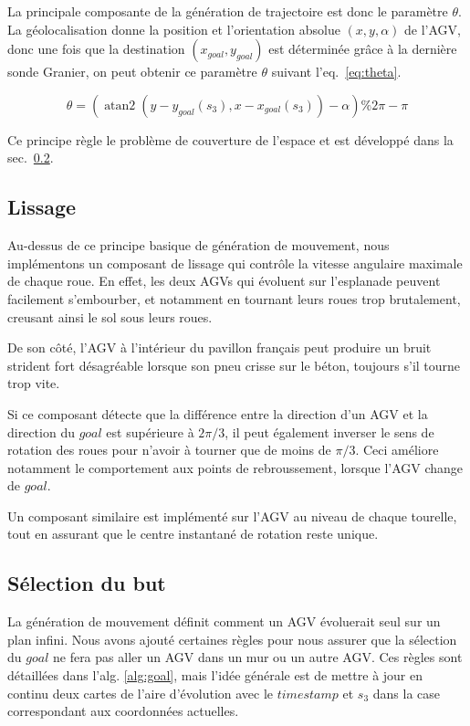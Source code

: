 \documentclass[french,A4paper,]{book}
\begin{document}
La principale composante de la génération de trajectoire est donc le
paramètre \(\theta\). La géolocalisation donne la position et
l'orientation absolue \((x, y, \alpha)\) de l'AGV, donc une fois que la
destination \((x_{goal}, y_{goal})\) est déterminée grâce à la dernière
sonde Granier, on peut obtenir ce paramètre \(\theta\) suivant
l'eq.~\ref{eq:theta}.

\begin{equation}
\theta = \left(\operatorname{atan2}\left(y - y_{goal}(s_3), x - x_{goal}(s_3)\right) - \alpha\right) \% 2 \pi - \pi
\label{eq:theta}\end{equation}

Ce principe règle le problème de couverture de l'espace et est développé
dans la sec.~\ref{sec:transgoal}.

\subsection{Lissage}\label{sec:translissage}

Au-dessus de ce principe basique de génération de mouvement, nous
implémentons un composant de lissage qui contrôle la vitesse angulaire
maximale de chaque roue. En effet, les deux AGVs qui évoluent sur
l'esplanade peuvent facilement s'embourber, et notamment en tournant
leurs roues trop brutalement, creusant ainsi le sol sous leurs roues.

De son côté, l'AGV à l'intérieur du pavillon français peut produire un
bruit strident fort désagréable lorsque son pneu crisse sur le béton,
toujours s'il tourne trop vite.

Si ce composant détecte que la différence entre la direction d'un AGV et
la direction du \(goal\) est supérieure à \(2\pi/3\), il peut également
inverser le sens de rotation des roues pour n'avoir à tourner que de
moins de \(\pi/3\). Ceci améliore notamment le comportement aux points
de rebroussement, lorsque l'AGV change de \(goal\).

Un composant similaire est implémenté sur l'AGV au niveau de chaque
tourelle, tout en assurant que le centre instantané de rotation reste
unique.

\subsection{Sélection du but}\label{sec:transgoal}

La génération de mouvement définit comment un AGV évoluerait seul sur un
plan infini. Nous avons ajouté certaines règles pour nous assurer que la
sélection du \(goal\) ne fera pas aller un AGV dans un mur ou un autre
AGV. Ces règles sont détaillées dans l'alg. \ref{alg:goal}, mais l'idée
générale est de mettre à jour en continu deux cartes de l'aire
d'évolution avec le \(timestamp\) et \(s_3\) dans la case correspondant
aux coordonnées actuelles.
\end{document}
